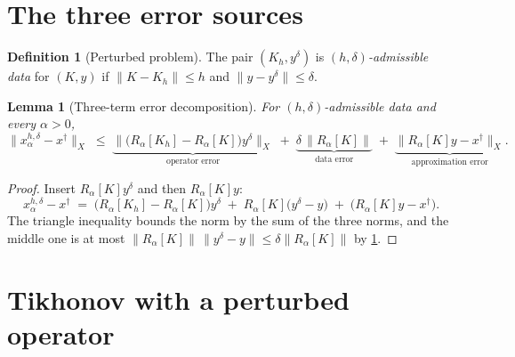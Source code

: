 \documentclass[a4paper]{report}
\theoremstyle{plain}
\newtheorem{lemma}[theorem]{Lemma}
\theoremstyle{definition}
\newtheorem{definition}[theorem]{Definition}
\theoremstyle{remark}
\newcommand{\dg}{^{\dagger}}
\begin{document}
\section{The three error sources}

\begin{definition}[Perturbed problem]
  \label{def_perturbed_problem}
  The pair $(K_h,y^{\delta})$ is \emph{$(h,\delta)$-admissible data} for $(K,y)$ if
  $\|K-K_h\| \le h$ and $\|y-y^{\delta}\| \le \delta$.
\end{definition}


\begin{lemma}[Three-term error decomposition]
  \label{lem_perturbed_decomposition}
  For $(h,\delta)$-admissible data and every $\alpha > 0$,
  \[
    \|x^{h,\delta}_{\alpha} - x\dg\|_X
      \;\le\; \underbrace{\bigl\|\bigl(R_{\alpha}[K_h]-R_{\alpha}[K]\bigr)y^{\delta}
        \bigr\|_X}_{\text{operator error}}
      \;+\; \underbrace{\delta\,\|R_{\alpha}[K]\|}_{\text{data error}}
      \;+\; \underbrace{\|R_{\alpha}[K]y - x\dg\|_X}_{\text{approximation error}} .
  \]
\end{lemma}
\begin{proof}
  Insert $R_{\alpha}[K]y^{\delta}$ and then $R_{\alpha}[K]y$:
  \[
    x^{h,\delta}_{\alpha} - x\dg
      \;=\; \bigl(R_{\alpha}[K_h]-R_{\alpha}[K]\bigr)y^{\delta}
        \;+\; R_{\alpha}[K]\bigl(y^{\delta}-y\bigr)
        \;+\; \bigl(R_{\alpha}[K]y - x\dg\bigr) .
  \]
  The triangle inequality bounds the norm by the sum of the three norms, and the middle
  one is at most $\|R_{\alpha}[K]\|\,\|y^{\delta}-y\| \le \delta\|R_{\alpha}[K]\|$ by
  \cref{def_perturbed_problem}.
\end{proof}


\section{Tikhonov with a perturbed operator}
\end{document}
